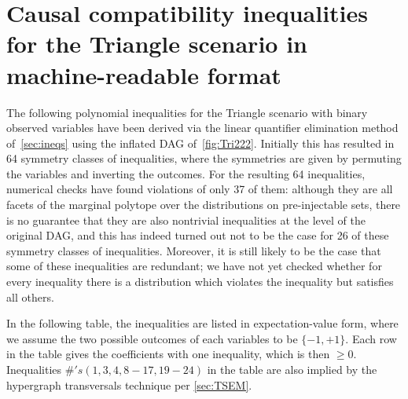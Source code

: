 \section{Causal compatibility inequalities for the Triangle scenario in machine-readable format}
\label{sec:38ineqs}

The following polynomial inequalities for the Triangle scenario with binary observed variables have been derived via the linear quantifier elimination method of~\cref{sec:ineqs} using the inflated DAG of~\cref{fig:Tri222}. Initially this has resulted in 64 symmetry classes of inequalities, where the symmetries are given by permuting the variables and inverting the outcomes. For the resulting 64 inequalities, numerical checks have found violations of only 37 of them: although they are all facets of the marginal polytope over the distributions on pre-injectable sets, there is no guarantee that they are also nontrivial inequalities at the level of the original DAG, and this has indeed turned out not to be the case for 26 of these symmetry classes of inequalities. Moreover, it is still likely to be the case that some of these inequalities are redundant; we have not yet checked whether for every inequality there is a distribution which violates the inequality but satisfies all others.

In the following table, the inequalities are listed in expectation-value form, where we assume the two possible outcomes of each variables to be $\{-1,+1\}$. Each row in the table gives the coefficients with one inequality, which is then $\geq 0$. Inequalities $\#'s (1, 3, 4, 8-17, 19-24)$ in the table are also implied by the hypergraph transversals technique per \cref{sec:TSEM}.

